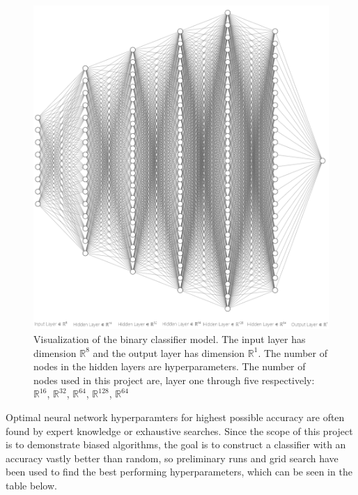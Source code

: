 \documentclass[11pt, fleqn, titlepage]{article}
\begin{document}
	\begin{figure}[H]
		\centering
		\includegraphics[scale=0.5]{imgs/ffnn}
		\caption{Visualization of the binary classifier model. The input layer has dimension $ \mathbb R ^8$ and the output layer has dimension $ \mathbb R^1 $. The number of nodes in the hidden layers are hyperparameters. The number of nodes used in this project are, layer one through five respectively: $ \mathbb R ^{16} $, $ \mathbb R ^{32} $, $ \mathbb R ^{64} $, $ \mathbb R ^{128} $, $ \mathbb R ^{64} $}
		\label{fig:ffnn}
	\end{figure}
		
	\noindent 
	Optimal neural network hyperparamters for highest possible accuracy are often found by expert knowledge or exhaustive searches. Since the scope of this project is to demonstrate biased algorithms, the goal is to construct a classifier with an accuracy vastly better than random, so preliminary runs and grid search have been used to find the best performing hyperparameters, which can be seen in the table below.
	
\end{document}
